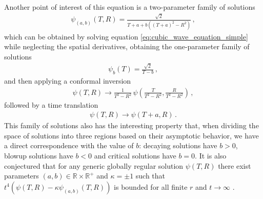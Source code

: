 Another point of interest of this equation is a two-parameter family of solutions 
%
\begin{align}
    \psi_{(a, b)}(T, R) = \frac{\sqrt{2}}{T + a + b \left( (T+ a)^2 - R^2 \right)} \, ,
\end{align}
%
which can be obtained by solving equation \eqref{eq:cubic_wave_equation_simple} while neglecting the spatial derivatives,
obtaining the one-parameter family of solutions
%
\begin{align}
    \psi_{b}(T) = \frac{\sqrt{2}}{T - b} \, ,
\end{align}
%
and then applying a conformal inversion 
%
\begin{align}
    \psi(T,R) \rightarrow \frac{1}{T^2 - R^2} \, \psi\left(\frac{T}{T^2 - R^2}, \frac{R}{T^2 - R^2}\right) \, ,
\end{align}
%
followed by a time translation
%
\begin{align}
    \psi(T,R) \rightarrow \psi(T + a, R) \, .
\end{align}
%
This family of solutions also has the interesting property that, when dividing the space of solutions into three regions based on their asymptotic behavior, we have a direct correspondence with the value of $b$: decaying solutions have $b > 0$, blowup solutions have $b < 0$ and critical solutions have $b = 0$. It is also conjectured that for any generic globally regular solution $\psi(T, R)$ there exist parameters $(a,b) \in \mathbb{R} \times \mathbb{R}^{+} $ and $\kappa = \pm 1$ such that $t^4 \left(\psi(T, R) - \kappa \psi_{(a, b)}(T, R) \right)$ is bounded for all finite $r$ and $t \to \infty$ \cite{Universality_of_global_dynamics_for_the_cubic_wave_equation}.

